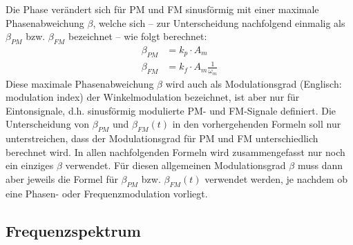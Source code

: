 Die Phase verändert sich für PM und FM sinusförmig mit einer maximale Phasenabweichung \(\beta\),
 welche sich -- zur Unterscheidung nachfolgend einmalig als \(\beta_{PM}\) bzw. \(\beta_{FM}\) bezeichnet -- wie folgt berechnet:
 \begin{align}
    \beta_{PM} &= k_p \cdot A_m
    \\
    \beta_{FM} &= k_f \cdot A_m \frac{1}{\omega_m} 
\end{align}
Diese maximale Phasenabweichung \(\beta\) wird auch als Modulationsgrad (Englisch: modulation index) der Winkelmodulation bezeichnet, ist aber nur für Eintonsignale,
 d.h. sinusförmig modulierte PM- und FM-Signale definiert. 
Die Unterscheidung von \(\beta_{PM}\) und \(\beta_{FM}(t)\) in den vorhergehenden Formeln soll nur unterstreichen, dass
der Modulationsgrad für PM und FM unterschiedlich berechnet wird.
In allen nachfolgenden Formeln wird zusammengefasst nur noch ein einziges \(\beta\) verwendet. 
Für diesen allgemeinen Modulationsgrad \(\beta\) muss dann aber jeweils die Formel für \(\beta_{PM}\) bzw. \(\beta_{FM}(t)\) verwendet werden,
 je nachdem ob eine Phasen- oder Frequenzmodulation vorliegt.


\subsection{Frequenzspektrum}


